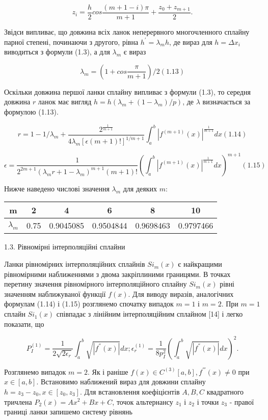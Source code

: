 \documentclass[ukrainian,14pt]{extarticle}
\begin{document}
$$z_i = \frac{h}{2} cos \frac{(m+1-i)\pi}{m+1} + \frac{z_0 + z_{m+1}}{2}.$$

Звідси випливає, що довжина всіх ланок неперервного многочленного сплайну парної степені, починаючи з другого, рівна $h^' = \lambda_m h$, де вираз для $h = \Delta x_i$ виводиться з формули (1.3), а для $\lambda_m$ є вираз

$$\lambda_m = \left(1 + cos\frac{\pi}{m+1}\right) / 2 (1.13)$$

Оскільки довжина першої ланки сплайну випливає з формули (1.3), то середня довжина $r$ ланок має вигляд $h = h(\lambda_m + (1 - \lambda_m) / p)$, де $\lambda$ визначається за формулою (1.13). %

$$r = 1 - 1/ \lambda_m + \frac{2^{\frac{1}{m+1}}}{4 \lambda_m [\epsilon(m+1)!]^{1/m+1}} \int_a^b |f^{(m+1)}(x)|^{\frac{1}{m+1}} dx (1.14)$$

$$\epsilon = \frac{1}{2^{2m+1} (\lambda_m r + 1 - \lambda_m)^{m+1}(m+1)!} \left(\int_a^b|f^{(m+1)}(x)|^{\frac{1}{m+1}} dx \right)^{m+1} (1.15)$$

Нижче наведено числові значення $\lambda_m$ для деяких $m$:

\bgroup
\def\arraystretch{1.5}
\begin{center}
\begin{tabular}{ c | c |
c | c | c | c}
 m & 2 & 4 & 6 & 8 & 10 \\
 \hline
 $\lambda_m$ & 0.75 & 0.9045085 & 0.9504844 & 0.9698463 & 0.9797466 \\  

\end{tabular}
\end{center}
\egroup

1.3. Рівномірні інтерполяційні сплайни

Ланки рівномірних інтерполяційних сплайнів $Si_m(x)$ є найкращими рівномірними наближеннями з двома закріплиними границями. В точках перетину значення рівномірного інтерполяційного сплайну $Si_m(x)$ рівні значенням наближуваної функції $f(x)$. Для виводу виразів, аналогічних формулам (1.14) і (1.15) розглянемо спочатку випадок $m = 1$ і $m = 2$. При $m = 1$ сплайн $Si_1(x)$ співпадає з лінійним інтерполяційним сплайном [14] і легко показати, що

$$P^{(1)}_I = \frac{1}{2\sqrt{2\epsilon_r}} \int_a^b \sqrt{|f^{''}(x)|}dx; \epsilon^{(1)}_r = \frac{1}{8p_{I}^2} \left(\int_a^b \sqrt{|f^{''}(x)|}dx \right)^2.$$

Розглянемо випадок $m = 2$. Як і раніше $f(x) \in C^{(3)} [a, b], f^{'''}(x) \neq 0$ при $x \in [a, b]$. Встановимо наближений вираз для довжини сплайну $h  = z_3 - z_0, x \in [z_0, z_3].$ Для встановлення коефіцієнтів $A, B, C$ квадратного тричлена $P_2(x) = Ax^2 + Bx + C$, точок альтернансу $z_1$ і $z_2$ і точки $z_3$ - правої границі ланки запишемо систему рівнянь
\end{document}
